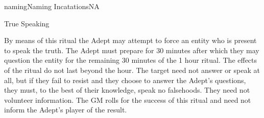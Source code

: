 \begin{College}[2.0]{naming}{Naming Incatations}{NA}
\begin{ritual}[R-7]{True Speaking}
\begin{effects}
By means of this ritual the Adept may attempt to force an entity who
is present to speak the truth.  The Adept must prepare for 30 minutes
after which they may question the entity for the remaining 30 minutes
of the 1 hour ritual.  The effects of the ritual do not last beyond
the hour.  The target need not answer or speak at all, but if they
fail to resist and they choose to answer the Adept’s questions, they
must, to the best of their knowledge, speak no falsehoods.  They need
not volunteer information.  The GM rolls for the success of this
ritual and need not inform the Adept’s player of the result.
\end{effects}
\end{ritual}
\end{College}
